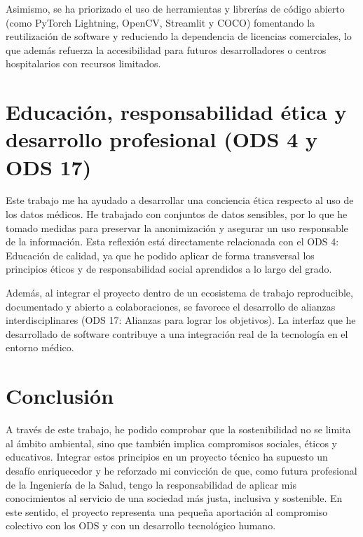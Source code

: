 Asimismo, se ha priorizado el uso de herramientas y librerías de código abierto (como PyTorch Lightning, OpenCV, Streamlit y COCO) fomentando la reutilización de software y reduciendo la dependencia de licencias comerciales, lo que además refuerza la accesibilidad para futuros desarrolladores o centros hospitalarios con recursos limitados.

\section{Educación, responsabilidad ética y desarrollo profesional (ODS 4 y ODS 17)}
Este trabajo me ha ayudado a desarrollar una conciencia ética respecto al uso de los datos médicos. He trabajado con conjuntos de datos sensibles, por lo que he tomado medidas para preservar la anonimización y asegurar un uso responsable de la información. Esta reflexión está directamente relacionada con el ODS 4: Educación de calidad, ya que he podido aplicar de forma transversal los principios éticos y de responsabilidad social aprendidos a lo largo del grado.

Además, al integrar el proyecto dentro de un ecosistema de trabajo reproducible, documentado y abierto a colaboraciones, se favorece el desarrollo de alianzas interdisciplinares (ODS 17: Alianzas para lograr los objetivos). La interfaz que he desarrollado de software contribuye a una integración real de la tecnología en el entorno médico.

\section{Conclusión}
A través de este trabajo, he podido comprobar que la sostenibilidad no se limita al ámbito ambiental, sino que también implica compromisos sociales, éticos y educativos. Integrar estos principios en un proyecto técnico ha supuesto un desafío enriquecedor y he reforzado mi convicción de que, como futura profesional de la Ingeniería de la Salud, tengo la responsabilidad de aplicar mis conocimientos al servicio de una sociedad más justa, inclusiva y sostenible. En este sentido, el proyecto representa una pequeña aportación al compromiso colectivo con los ODS y con un desarrollo tecnológico humano.
